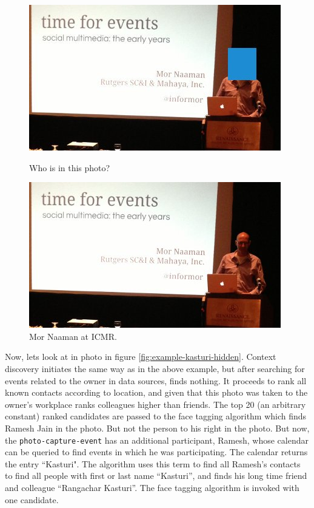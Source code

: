 \begin{figure}[ht]
\begin{minipage}[b]{0.45\linewidth}
\centering
\includegraphics[width=\textwidth]{media/chapter1/icmr-keynote-2-hidden.jpg}
\caption{Who is in this photo?}
\label{fig:example-icmr-hidden}
\end{minipage}
\hspace{0.5cm}
\begin{minipage}[b]{0.45\linewidth}
\centering
\includegraphics[width=\textwidth]{media/chapter1/icmr-keynote-2-show.jpg}
\caption{Mor Naaman at ICMR.}
\label{fig:example-icmr-show}
\end{minipage}
\end{figure}

Now, lets look at in photo in figure \ref{fig:example-kasturi-hidden}. Context discovery initiates the same way as in the above example, but after searching for events related to the owner in data sources, finds nothing. It proceeds to rank all known contacts according to location, and given that this photo was taken to the owner's workplace ranks colleagues higher than friends. The top 20 (an arbitrary constant) ranked candidates are passed to the face tagging algorithm which finds Ramesh Jain in the photo. But not the person to his right in the photo. But now, the \texttt{photo-capture-event} has an additional participant, Ramesh, whose calendar can be queried to find events in which he was participating. The calendar returns the entry ``Kasturi". The algorithm uses this term to find all Ramesh's contacts to find all people with first or last name ``Kasturi'', and finds his long time friend and colleague ``Rangachar Kasturi''. The face tagging algorithm is invoked with one candidate.

